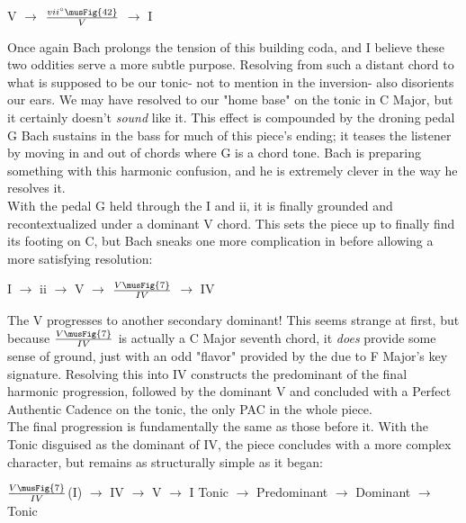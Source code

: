 \documentclass[a4paper,12pt]{report}
\begin{document}
\begin{center}
V $\rightarrow$ $\frac{vii^{\circ}\musFig{4 2}}{V}$ $\rightarrow$ I
\end{center}

\doublespacing
Once again Bach prolongs the tension of this building coda, and I believe these two oddities serve a more subtle purpose. Resolving from such a distant chord to what is supposed to be our tonic- not to mention in the  inversion- also disorients our ears. We may have resolved to our "home base" on the tonic in C Major, but it certainly doesn't \textit{sound} like it. This effect is compounded by the droning pedal G Bach sustains in the bass for much of this piece's ending; it teases the listener by moving in and out of chords where G is a chord tone. Bach is preparing something with this harmonic confusion, and he is extremely clever in the way he resolves it.\\
\indent With the pedal G held through the I and ii, it is finally grounded and recontextualized under a dominant V chord. This sets the piece up to finally find its footing on C, but Bach sneaks one more complication in before allowing a more satisfying resolution:

\begin{center}
I $\rightarrow$ ii $\rightarrow$ V $\rightarrow$ $\frac{V\musFig{7}}{IV}$ $\rightarrow$ IV
\end{center}

\doublespacing
The V progresses to another secondary dominant! This seems strange at first, but because $\frac{V\musFig{7}}{IV}$ is actually a C Major seventh chord, it \textit{does} provide some sense of ground, just with an odd "flavor" provided by the  due to F Major's key signature. Resolving this into IV constructs the predominant of the final harmonic progression, followed by the dominant V and concluded with a Perfect Authentic Cadence on the tonic, the only PAC in the whole piece. \\
\indent The final progression is fundamentally the same as those before it. With the Tonic disguised as the dominant of IV, the piece concludes with a more complex character, but remains as structurally simple as it began:

\begin{center}
$\frac{V\musFig{7}}{IV}$(I) $\rightarrow$ IV $\rightarrow$ V $\rightarrow$ I \linebreak
Tonic $\rightarrow$ Predominant $\rightarrow$ Dominant $\rightarrow$ Tonic
\end{center}
\end{document}
